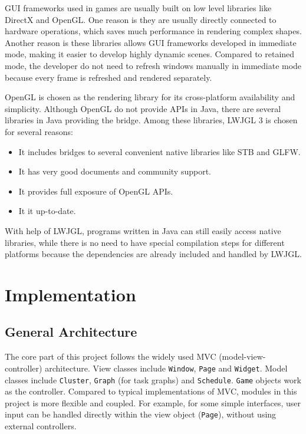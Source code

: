 \documentclass[msc,deptreport, cs]{infthesis}
\begin{document}
GUI frameworks used in games are usually built on low level libraries like DirectX and OpenGL. One reason is they are usually directly connected to hardware operations, which saves much performance in rendering complex shapes. Another reason is these libraries allows GUI frameworks developed in immediate mode, making it easier to develop highly dynamic scenes. Compared to retained mode, the developer do not need to refresh windows manually in immediate mode because every frame is refreshed and rendered separately.

OpenGL is chosen as the rendering library for its cross-platform availability and simplicity. Although OpenGL do not provide APIs in Java, there are several libraries in Java providing the bridge. Among these libraries, LWJGL 3 is chosen for several reasons:

\begin{itemize}
  \vspace{-1em}\item It includes bridges to several convenient native libraries like STB and GLFW.
  \vspace{-1em}\item It has very good documents and community support.
  \vspace{-1em}\item It provides full exposure of OpenGL APIs.
  \vspace{-1em}\item It it up-to-date.
\end{itemize}

With help of LWJGL, programs written in Java can still easily access native libraries, while there is no need to have special compilation steps for different platforms because the dependencies are already included and handled by LWJGL.

\chapter{Implementation}

\section{General Architecture}

The core part of this project follows the widely used MVC (model-view-controller) architecture. View classes include \verb+Window+, \verb+Page+ and \verb+Widget+. Model classes include \verb+Cluster+, \verb+Graph+ (for task graphs) and \verb+Schedule+. \verb+Game+ objects work as the controller. Compared to typical implementations of MVC, modules in this project is more flexible and coupled. For example, for some simple interfaces, user input can be handled directly within the view object (\verb+Page+), without using external controllers.
\end{document}
